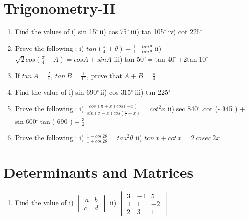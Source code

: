 \documentclass[14pt]{article}
\newcommand{\degree}{$^{\circ}\ $} %
\begin{document}
\begin{multicols}{2}
\begin{enumerate}[resume]
\end{enumerate} 




\section{Trigonometry-II}
\noindent
\begin{enumerate}[resume]

\item Find the values of i) sin 15\degree ii) cos 75\degree iii) tan 105\degree iv) cot 225\degree

\item Prove the following : i) $tan \left(\frac{\pi}{4}+\theta \right)=\frac{1-tan\,\theta}{1+tan\,\theta}$ ii) $\sqrt{2}cos \left(\frac{\pi}{4}-A \right) = cos A + sin A$ iii) tan 50\degree = tan 40\degree+2tan 10\degree

\item If $tan\,A=\frac{5}{6},\,tan\,B=\frac{1}{11}$, prove that $A+B=\frac{\pi}{4} $  

\item Find the value of i) sin 690\degree ii) cos 315\degree iii) tan 225\degree


\item Prove the following : i) $\frac{cos\,(\pi+x)cos(-x)}{sin(\pi-x)cos\left(\frac{\pi}{2}+x \right)}=cot^2x$ ii) sec 840\degree.cot (- 945$^{\circ}$) + sin 600\degree tan (-690$^{\circ}$)$=\frac{3}{2}$

\item Prove the following : i) $\frac{1-cos\,2\theta}{1+cos\,2\theta}=tan^2\theta$ ii) $tan\,x + cot\,x = 2\,cosec\,2x $

\end{enumerate} 



\section{Determinants and Matrices}
\noindent
\begin{enumerate}[resume]

\item Find the value of 
i) $\begin{vmatrix} \,a & b \\c & d \,\end{vmatrix}$ 
ii) $\begin{vmatrix} 3 & -4 & 5 \\ \, 1 & 1 & -2\,\\ 2 & 3 & 1\end{vmatrix}$ 


\end{enumerate}
\end{multicols}
\end{document}
